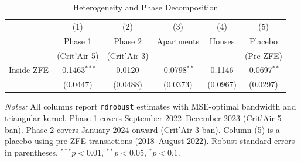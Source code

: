 \begin{table}[htbp]
\centering
\caption{Heterogeneity and Phase Decomposition}
\label{tab:hetero}
\begin{tabular}{lccccc}
\toprule
 & (1) & (2) & (3) & (4) & (5) \\
 & Phase 1 & Phase 2 & Apartments & Houses & Placebo \\
 & (Crit'Air 5) & (Crit'Air 3) & & & (Pre-ZFE) \\
\midrule
Inside ZFE & -0.1463$^{***}$ & 0.0120 & -0.0798$^{**}$ & 0.1146 & -0.0697$^{**}$ \\
 & (0.0447) & (0.0488) & (0.0373) & (0.0967) & (0.0297) \\
\bottomrule
\end{tabular}
\begin{tablenotes}[flushleft]\small
\item \textit{Notes:} All columns report \texttt{rdrobust} estimates with MSE-optimal bandwidth and triangular kernel. Phase 1 covers September 2022--December 2023 (Crit'Air 5 ban). Phase 2 covers January 2024 onward (Crit'Air 3 ban). Column (5) is a placebo using pre-ZFE transactions (2018--August 2022). Robust standard errors in parentheses. $^{***}p<0.01$, $^{**}p<0.05$, $^{*}p<0.1$.
\end{tablenotes}
\end{table}

